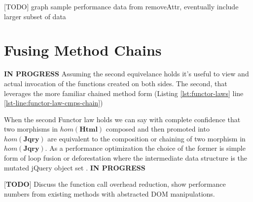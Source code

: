 \documentclass[preprint, leqno]{sigplanconf}
\begin{document}
[TODO] graph sample performance data from removeAttr, eventually include larger subset of data

\section{Fusing Method Chains}\label{sec:fusing-method-chains}

\textbf{IN PROGRESS}
Assuming the second equivelance holds it's useful to view and actual invocation of the functions created on both sides. The second, that leverages the more familiar chained method form (Listing \ref{lst:functor-laws} line \ref{lst-line:functor-law-cmps-chain})

 When the second Functor law holds we can say with complete confidence that two morphisms in \begin{math}hom(\mathbf{Html})\end{math} composed and then promoted into \begin{math}hom(\mathbf{Jqry})\end{math} are equivalent to the composition or chaining of two morphism in \begin{math}hom(\mathbf{Jqry})\end{math}. As a performance optimization the choice of the former is simple form of loop fusion or deforestation where the intermediate data structure is the mutated jQuery object set \cite{bib:deforestation}.
\textbf{IN PROGRESS}


[\textbf{TODO}] Discuss the function call overhead reduction, show performance numbers from existing methods with abstracted DOM manipulations.

\end{document}
